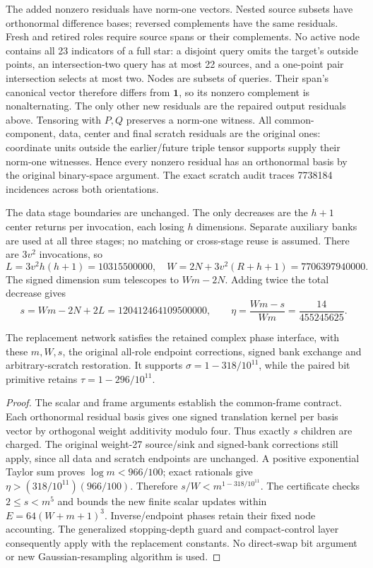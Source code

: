 The added nonzero residuals have norm-one vectors. Nested source subsets have
orthonormal difference bases; reversed complements have the same residuals.
Fresh and retired roles require source spans or their complements. No active
node contains all 23 indicators of a full star: a disjoint query omits the
target's outside points, an intersection-two query has at most 22 sources,
and a one-point pair intersection selects at most two. Nodes are subsets
of queries. Their span's canonical vector therefore differs from $\mathbf1$,
so its nonzero complement is nonalternating. The only other new residuals
are the repaired output residuals above. Tensoring with $P,Q$ preserves a
norm-one witness. All common-component, data, center and final scratch
residuals are the original ones: coordinate units outside the earlier/future
triple tensor supports supply their norm-one witnesses. Hence every nonzero
residual has an orthonormal basis by the original binary-space argument.
The exact scratch audit traces 7738184 incidences across both orientations.

The data stage boundaries are unchanged. The only decreases are the $h+1$
center returns per invocation, each losing $h$ dimensions. Separate auxiliary
banks are used at all three stages; no matching or cross-stage reuse is assumed.
There are $3v^2$ invocations, so
\[
 L=3v^2h(h+1)=10315500000,\quad
 W=2N+3v^2(R+h+1)=7706397940000.
\]
The signed dimension sum telescopes to $Wm-2N$. Adding twice the total
decrease gives
\[
 s=Wm-2N+2L=120412464109500000,
 \qquad \eta=\frac{Wm-s}{Wm}=\frac{14}{455245625}.
\]

\begin{proposition}\label{prop:orthogonal-star-interface}
The replacement network satisfies the retained complex phase interface,
with these $m,W,s$, the original all-role endpoint corrections, signed bank
exchange and arbitrary-scratch restoration. It supports
$\sigma=1-318/10^{11}$, while the paired bit primitive retains
$\tau=1-296/10^{11}$.
\end{proposition}
\begin{proof}
The scalar and frame arguments establish the common-frame contract.
Each orthonormal residual basis gives one signed translation kernel per
basis vector by orthogonal weight additivity modulo four. Thus exactly $s$
children are charged. The original weight-27 source/sink and signed-bank
corrections still apply, since all data and scratch endpoints are unchanged.
A positive exponential Taylor sum proves $\log m<966/100$; exact rationals
give $\eta>(318/10^{11})(966/100)$. Therefore
$s/W<m^{1-318/10^{11}}$. The certificate checks $2\le s<m^5$ and bounds
the new finite scalar updates within $E=64(W+m+1)^3$. Inverse/endpoint phases
retain their fixed node accounting. The generalized stopping-depth guard
and compact-control layer consequently apply with the replacement constants.
No direct-swap bit argument or new Gaussian-resampling algorithm is used.
\end{proof}
